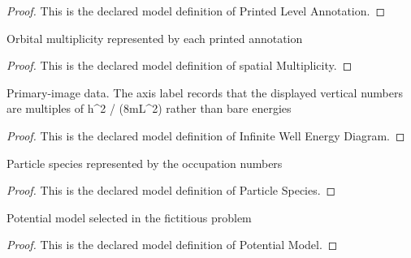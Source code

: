 \begin{proof}
  This is the declared model definition of Printed Level Annotation.
\end{proof}
\begin{definition}
  \label{def:physics:phyx-mini-0581:phyxminiproblems-problemphyxmini0581-printedlevelannotation-spatialmultiplicity}
  Orbital multiplicity represented by each printed annotation
\end{definition}
\begin{proof}
  This is the declared model definition of spatial Multiplicity.
\end{proof}
\begin{definition}
  \label{def:physics:phyx-mini-0581:phyxminiproblems-problemphyxmini0581-infinitewellenergydiagram}
  Primary-image data. The axis label records that the displayed vertical numbers are multiples of h\textasciicircum{}2 / (8mL\textasciicircum{}2) rather than bare energies
\end{definition}
\begin{proof}
  This is the declared model definition of Infinite Well Energy Diagram.
\end{proof}
\begin{definition}
  \label{def:physics:phyx-mini-0581:phyxminiproblems-problemphyxmini0581-particlespecies}
  Particle species represented by the occupation numbers
\end{definition}
\begin{proof}
  This is the declared model definition of Particle Species.
\end{proof}
\begin{definition}
  \label{def:physics:phyx-mini-0581:phyxminiproblems-problemphyxmini0581-potentialmodel}
  Potential model selected in the fictitious problem
\end{definition}
\begin{proof}
  This is the declared model definition of Potential Model.
\end{proof}
